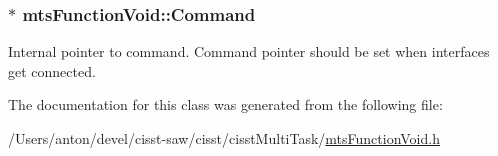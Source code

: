 \subsubsection[{Command}]{$\ast$ mts\+Function\+Void\+::\+Command\hspace{0.3cm}{\ttfamily [protected]}}\label{classmts_function_void_aa0384f1c3e204da6b625e520bbdef6c5}
Internal pointer to command. Command pointer should be set when interfaces get connected. 

The documentation for this class was generated from the following file\+:\begin{DoxyCompactItemize}
\item 
/\+Users/anton/devel/cisst-\/saw/cisst/cisst\+Multi\+Task/\hyperlink{mts_function_void_8h}{mts\+Function\+Void.\+h}\end{DoxyCompactItemize}
